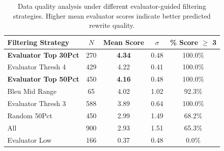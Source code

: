 \begin{table}[t]
\centering
\caption{Data quality analysis under different evaluator-guided filtering strategies. Higher mean evaluator scores indicate better predicted rewrite quality.}
\label{tab:downstream_filtering}
\begin{tabular}{lcccc}
\toprule
Filtering Strategy & $N$ & Mean Score & $\sigma$ & \% Score $\geq$ 3 \\
\midrule
\textbf{Evaluator Top 30Pct} & 270 & \textbf{4.34} & 0.48 & 100.0\% \\
Evaluator Thresh 4 & 429 & 4.22 & 0.41 & 100.0\% \\
\textbf{Evaluator Top 50Pct} & 450 & \textbf{4.16} & 0.48 & 100.0\% \\
Bleu Mid Range & 65 & 4.02 & 1.02 & 92.3\% \\
Evaluator Thresh 3 & 588 & 3.89 & 0.64 & 100.0\% \\
Random 50Pct & 450 & 2.99 & 1.49 & 68.2\% \\
All & 900 & 2.93 & 1.51 & 65.3\% \\
Evaluator Low & 166 & 0.37 & 0.48 & 0.0\% \\
\bottomrule
\end{tabular}
\end{table}
